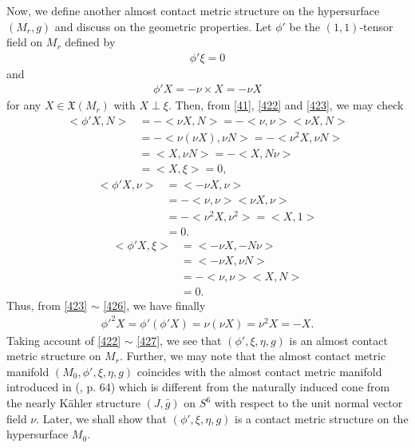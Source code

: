 \documentclass[12pt]{article}
\numberwithin{equation}{section}
\begin{document}
\noindent
{{Now,}} we define another almost contact metric structure on the
hypersurface $(M_{r}, g)$ and discuss on the geometric properties.
Let $\phi'$ be the $(1,1)$-tensor field on $M_{r}$ defined by
\begin{equation}\label{422}
\begin{split}
\phi '\xi=0
\end{split}
\end{equation}
and
\begin{equation}\label{423}
\begin{split}
\phi 'X=-\nu \times X=-\nu X
\end{split}
\end{equation}
for any $X\in\mathfrak{X}(M_{r})$ with $X \perp \xi$. Then, from {\eqref{41}}, \eqref{422} and \eqref{423}, we may check
\begin{equation}\label{424}
\begin{split}
<\phi 'X, N>&=-<\nu X, N>= -<\nu, \nu><\nu X, N>\\
&=-<\nu(\nu X), \nu N>=-<\nu^{2} X, \nu N >\\
&=<X, \nu N >= -<X, N\nu >\\
&=<X, \xi>=0,
\end{split}
\end{equation}
\begin{equation}\label{425}
\begin{split}
<\phi 'X, \nu>&=<-\nu X, \nu>\\
&=-<\nu, \nu><\nu X, \nu>\\
&=-<\nu^{2} X,\nu^{2}>=<X,1>\\
&=0.
\end{split}
\end{equation}
\begin{equation}\label{426}
\begin{split}
<\phi 'X, \xi>&=<-\nu X, -N\nu>\\
&=<-\nu X, \nu N>\\
&=-<\nu, \nu><X, N>\\
&=0.
\end{split}
\end{equation}
Thus, from \eqref{423} $\sim$ \eqref{426}, we have finally
\begin{equation}\label{427}
\begin{split}
\phi '^2X =\phi '(\phi ' X)=\nu(\nu X)=\nu^{2}X =-X.
\end{split}
\end{equation}
Taking account of \eqref{422} $\sim$ \eqref{427}, we see that $(\phi', \xi, \eta, g)$ is an almost contact metric structure on $M_{r}$.
Further, we may note that the almost contact metric manifold $(M_0,\phi ', \xi, \eta, g)$ coincides with the almost contact metric
manifold introduced in (\cite{B1}, p. 64) which is different from the naturally induced cone from the nearly K\"ahler structure $(J,\bar{g})$ on $S^6$ with respect to the unit normal vector field
$\nu$. Later, we shall show that $(\phi ', \xi, \eta, g)$ is a contact metric structure on the hypersurface $M_0$.
\end{document}
